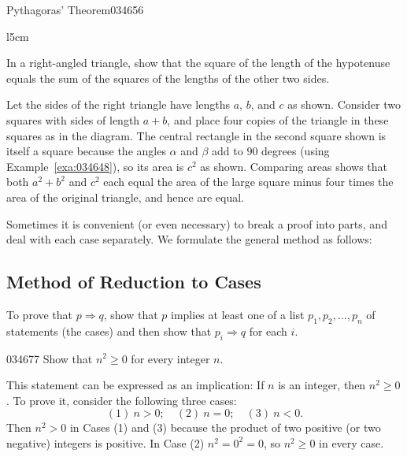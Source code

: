 \begin{example}{Pythagoras' Theorem}{034656}
\begin{wrapfigure}{l}{5cm} 
\vspace*{-1em}
\centering

\end{wrapfigure}

\setlength{\rightskip}{0pt plus 200pt}
In a right-angled triangle, show that 
the square of the length of the hypotenuse equals the sum of the squares
 of the lengths of the other two sides.

\begin{solution}
  Let the sides of the right triangle have lengths $a$, $b$, and $c$ as shown. Consider two squares with sides of length $a + b$,
 and place four copies of the triangle in these squares as in the 
diagram. The central rectangle in the second square shown is itself a 
square because the angles $\alpha$ and $\beta$ add to $90$ degrees (using Example~\ref{exa:034648}), so its area is $c^{2}$ as shown. Comparing areas shows that both $a^{2} + b^{2}$ and $c^{2}$ each equal the area of the large square minus four times the area of the original triangle, and hence are equal.
\vspace*{6em}
\end{solution}
\end{example}

Sometimes it is convenient (or even 
necessary) to break a proof into parts, and deal with each case 
separately. We formulate the general method as follows:


\subsection*{Method of Reduction to Cases}

To prove that $p \Rightarrow q$, show that $p$ implies at least one of a list $p_{1}, p_{2}, \dots , p_{n}$ of statements (the cases) and then show that $p_{i} \Rightarrow q$ for each $i$.


\begin{example}{}{034677}
Show that $n^{2} \geq 0$ for every integer $n$.


\begin{solution}
  This statement can be expressed as an implication: If $n$ is an integer, then $n^{2} \geq 0$. To prove it, consider the following three cases:
\begin{equation*}
(1) \ n > 0;  \quad (2) \ n = 0; \quad (3) \ n < 0.
\end{equation*}
Then $n^{2} > 0$ in Cases (1) and (3) because the product of two positive (or two negative) integers is positive. In Case (2) $n^{2} = 0^{2} = 0$, so $n^{2} \geq 0$ in every case.
\end{solution}
\end{example}

